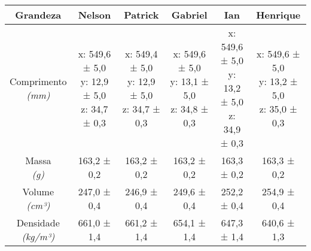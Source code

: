 \documentclass{article}
\begin{document}
\begin{table}[h!]
\centering
\begin{tabular}{c c c c c c }
\toprule
Grandeza & Nelson & Patrick & Gabriel & Ian & Henrique\\
\midrule
\shortstack{Comprimento\\\textit{(mm)}} & \shortstack{x: 549,6 ± 5,0\\y: 12,9 ± 5,0\\z: 34,7 ± 0,3} & \shortstack{x: 549,4 ± 5,0\\y: 12,9 ± 5,0\\z: 34,7 ± 0,3} & \shortstack{x: 549,6 ± 5,0\\y: 13,1 ± 5,0\\z: 34,8 ± 0,3} & \shortstack{x: 549,6 ± 5,0\\y: 13,2 ± 5,0\\z: 34,9 ± 0,3} & \shortstack{x: 549,6 ± 5,0\\y: 13,2 ± 5,0\\z: 35,0 ± 0,3}\\[4pt]
\shortstack{Massa\\\textit{(g)}} & 163,2 ± 0,2 & 163,2 ± 0,2 & 163,2 ± 0,2 & 163,3 ± 0,2 & 163,3 ± 0,2\\[4pt]
\shortstack{Volume\\\textit{(cm³)}} & 247,0 ± 0,4 & 246,9 ± 0,4 & 249,6 ± 0,4 & 252,2 ± 0,4 & 254,9 ± 0,4\\[4pt]
\shortstack{Densidade\\\textit{(kg/m³)}} & 661,0 ± 1,4 & 661,2 ± 1,4 & 654,1 ± 1,4 & 647,3 ± 1,4 & 640,6 ± 1,3\\[4pt]
\bottomrule
\end{tabular}
\end{table}
\end{document}
